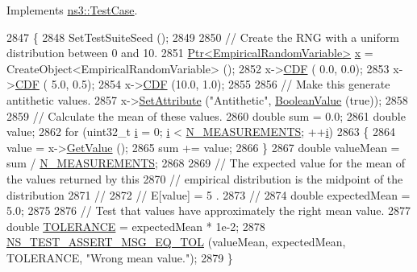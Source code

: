 Implements \hyperlink{classns3_1_1TestCase_a8ff74680cf017ed42011e4be51917a24}{ns3\+::\+Test\+Case}.


\begin{DoxyCode}
2847 \{
2848   SetTestSuiteSeed ();
2849 
2850   \textcolor{comment}{// Create the RNG with a uniform distribution between 0 and 10.}
2851   \hyperlink{classns3_1_1Ptr}{Ptr<EmpiricalRandomVariable>} \hyperlink{lte__link__budget__x2__handover__measures_8m_a9336ebf25087d91c818ee6e9ec29f8c1}{x} = CreateObject<EmpiricalRandomVariable> ();
2852   x->\hyperlink{classns3_1_1EmpiricalRandomVariable_a1f85096a98576ebe48417698f191805d}{CDF} ( 0.0,  0.0);
2853   x->\hyperlink{classns3_1_1EmpiricalRandomVariable_a1f85096a98576ebe48417698f191805d}{CDF} ( 5.0,  0.5);
2854   x->\hyperlink{classns3_1_1EmpiricalRandomVariable_a1f85096a98576ebe48417698f191805d}{CDF} (10.0,  1.0);
2855 
2856   \textcolor{comment}{// Make this generate antithetic values.}
2857   x->\hyperlink{classns3_1_1ObjectBase_ac60245d3ea4123bbc9b1d391f1f6592f}{SetAttribute} (\textcolor{stringliteral}{"Antithetic"}, \hyperlink{classns3_1_1BooleanValue}{BooleanValue} (\textcolor{keyword}{true}));
2858 
2859   \textcolor{comment}{// Calculate the mean of these values.}
2860   \textcolor{keywordtype}{double} sum = 0.0;
2861   \textcolor{keywordtype}{double} value;
2862   \textcolor{keywordflow}{for} (uint32\_t \hyperlink{bernuolliDistribution_8m_a6f6ccfcf58b31cb6412107d9d5281426}{i} = 0; \hyperlink{bernuolliDistribution_8m_a6f6ccfcf58b31cb6412107d9d5281426}{i} < \hyperlink{classRandomVariableStreamEmpiricalAntitheticTestCase_ad11d56c364b966694fdf0c339dfa4f72}{N\_MEASUREMENTS}; ++\hyperlink{bernuolliDistribution_8m_a6f6ccfcf58b31cb6412107d9d5281426}{i})
2863     \{
2864       value = x->\hyperlink{classns3_1_1EmpiricalRandomVariable_a1a2d5b20db4509d1518727eb725672f7}{GetValue} ();
2865       sum += value;
2866     \}
2867   \textcolor{keywordtype}{double} valueMean = sum / \hyperlink{classRandomVariableStreamEmpiricalAntitheticTestCase_ad11d56c364b966694fdf0c339dfa4f72}{N\_MEASUREMENTS};
2868 
2869   \textcolor{comment}{// The expected value for the mean of the values returned by this}
2870   \textcolor{comment}{// empirical distribution is the midpoint of the distribution}
2871   \textcolor{comment}{//}
2872   \textcolor{comment}{//     E[value]  =  5 .}
2873   \textcolor{comment}{//                          }
2874   \textcolor{keywordtype}{double} expectedMean = 5.0;
2875 
2876   \textcolor{comment}{// Test that values have approximately the right mean value.}
2877   \textcolor{keywordtype}{double} \hyperlink{spectrum-value-test_8cc_a30c17564229ec2e37dfea9c6c9ad643e}{TOLERANCE} = expectedMean * 1e-2;
2878   \hyperlink{group__testing_ga9e7861b56b4e70db3b56044cb7a28e41}{NS\_TEST\_ASSERT\_MSG\_EQ\_TOL} (valueMean, expectedMean, TOLERANCE, \textcolor{stringliteral}{"Wrong mean
       value."}); 
2879 \}
\end{DoxyCode}


